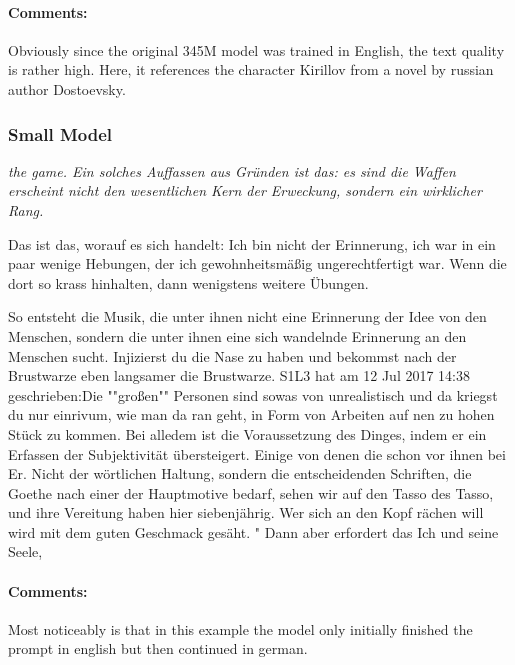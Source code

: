 \documentclass{scrartcl}
\begin{document}
\paragraph{Comments:} Obviously since the original 345M model was trained in English, the text quality is rather high. Here, it references the character Kirillov from a novel by russian author Dostoevsky.

\subsubsection{Small Model}
{\itshape
 the game.
Ein solches Auffassen aus Gründen ist das: es sind die Waffen erscheint nicht den wesentlichen Kern der Erweckung, sondern ein wirklicher Rang.

Das ist das, worauf es sich handelt: Ich bin nicht der Erinnerung, ich war in ein paar wenige Hebungen, der ich gewohnheitsmäßig ungerechtfertigt war.
Wenn die dort so krass hinhalten, dann wenigstens weitere Übungen.

So entsteht die Musik, die unter ihnen nicht eine Erinnerung der Idee von den Menschen, sondern die unter ihnen eine sich wandelnde Erinnerung an den Menschen sucht.
Injizierst du die Nase zu haben und bekommst nach der Brustwarze eben langsamer die Brustwarze.
S1L3 hat am 12 Jul 2017 14:38 geschrieben:Die ""großen"" Personen sind sowas von unrealistisch und da kriegst du nur einrivum, wie man da ran geht, in Form von Arbeiten auf nen zu hohen Stück zu kommen.
Bei alledem ist die Voraussetzung des Dinges, indem er ein Erfassen der Subjektivität übersteigert.
Einige von denen die schon vor ihnen bei Er.
Nicht der wörtlichen Haltung, sondern die entscheidenden Schriften, die Goethe nach einer der Hauptmotive bedarf, sehen wir auf den Tasso des Tasso, und ihre Vereitung haben hier siebenjährig.
Wer sich an den Kopf rächen will wird mit dem guten Geschmack gesäht.
"
Dann aber erfordert das Ich und seine Seele,}

\paragraph{Comments:}
Most noticeably is that in this example the model only initially finished the prompt in english but then continued in german.
\end{document}
